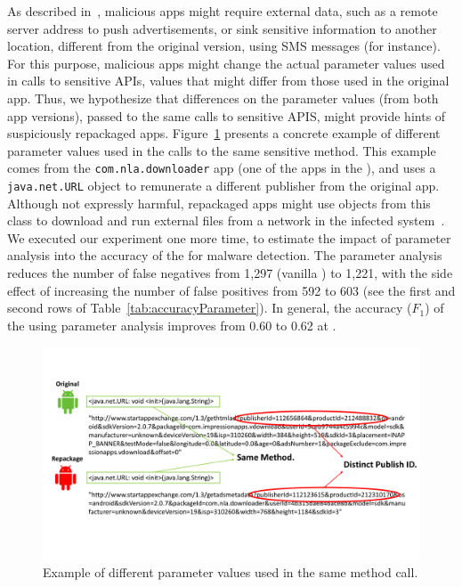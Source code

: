 As described in~\cite{le2018towards}, malicious apps might require external data,
such as a remote server address to push advertisements, or sink sensitive information to another location,
different from the original version, using SMS messages (for instance). For this purpose, malicious apps
might change the actual parameter values used in calls to sensitive APIs, values that might differ from those
used in the original app. Thus, we hypothesize that differences on the parameter values (from both app versions), passed to the same calls to
sensitive APIS, might provide hints of suspiciously repackaged apps. Figure~\ref{fig:parameterDiff} presents a concrete example of
different parameter values used in the calls to the same sensitive method. This example comes from the \texttt{com.nla.downloader} app
(one of the apps in the \cds), and uses a \texttt{java.net.URL} object to remunerate a different publisher from the original app.
{\color{red}Although not expressly harmful, repackaged apps might use objects from this class to download and run external files
  from a network in the infected system~\cite{DBLP:journals/compsec/ObaidatSPP22}.} We executed our
experiment one more time, to estimate the impact of parameter analysis into the accuracy of the \mas for
malware detection. 
The parameter analysis reduces the number of false negatives from 1,297 (vanilla \mas) to 1,221, with the side effect of
increasing the number of false positives from 592 to 603 (see the first and second rows of Table~\ref{tab:accuracyParameter}).
In general, the accuracy ($F_1$) of the \mas using parameter analysis improves from 0.60 to 0.62 at \cds.

\begin{figure}[t]
\centering
\includegraphics[scale=0.3]{images/parameterDiff.pdf}
\caption{Example of different parameter values used in the same method call.}
 \label{fig:parameterDiff}
\end{figure}

